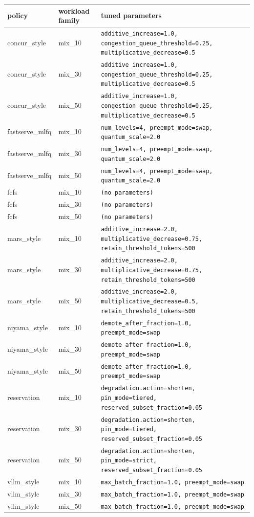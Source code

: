 \begin{tabular}{llp{3.1in}}
\toprule
policy & workload family & tuned parameters \\
\midrule
concur\_style & mix\_10 & \texttt{additive\_increase=1.0, congestion\_queue\_threshold=0.25, multiplicative\_decrease=0.5} \\
concur\_style & mix\_30 & \texttt{additive\_increase=1.0, congestion\_queue\_threshold=0.25, multiplicative\_decrease=0.5} \\
concur\_style & mix\_50 & \texttt{additive\_increase=1.0, congestion\_queue\_threshold=0.25, multiplicative\_decrease=0.5} \\
fastserve\_mlfq & mix\_10 & \texttt{num\_levels=4, preempt\_mode=swap, quantum\_scale=2.0} \\
fastserve\_mlfq & mix\_30 & \texttt{num\_levels=4, preempt\_mode=swap, quantum\_scale=2.0} \\
fastserve\_mlfq & mix\_50 & \texttt{num\_levels=4, preempt\_mode=swap, quantum\_scale=2.0} \\
fcfs & mix\_10 & \texttt{(no parameters)} \\
fcfs & mix\_30 & \texttt{(no parameters)} \\
fcfs & mix\_50 & \texttt{(no parameters)} \\
mars\_style & mix\_10 & \texttt{additive\_increase=2.0, multiplicative\_decrease=0.75, retain\_threshold\_tokens=500} \\
mars\_style & mix\_30 & \texttt{additive\_increase=2.0, multiplicative\_decrease=0.75, retain\_threshold\_tokens=500} \\
mars\_style & mix\_50 & \texttt{additive\_increase=2.0, multiplicative\_decrease=0.5, retain\_threshold\_tokens=500} \\
niyama\_style & mix\_10 & \texttt{demote\_after\_fraction=1.0, preempt\_mode=swap} \\
niyama\_style & mix\_30 & \texttt{demote\_after\_fraction=1.0, preempt\_mode=swap} \\
niyama\_style & mix\_50 & \texttt{demote\_after\_fraction=1.0, preempt\_mode=swap} \\
reservation & mix\_10 & \texttt{degradation.action=shorten, pin\_mode=tiered, reserved\_subset\_fraction=0.05} \\
reservation & mix\_30 & \texttt{degradation.action=shorten, pin\_mode=tiered, reserved\_subset\_fraction=0.05} \\
reservation & mix\_50 & \texttt{degradation.action=shorten, pin\_mode=strict, reserved\_subset\_fraction=0.05} \\
vllm\_style & mix\_10 & \texttt{max\_batch\_fraction=1.0, preempt\_mode=swap} \\
vllm\_style & mix\_30 & \texttt{max\_batch\_fraction=1.0, preempt\_mode=swap} \\
vllm\_style & mix\_50 & \texttt{max\_batch\_fraction=1.0, preempt\_mode=swap} \\
\bottomrule
\end{tabular}
